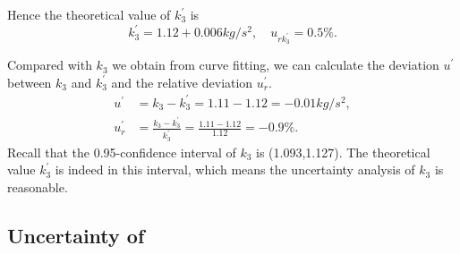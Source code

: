     Hence the theoretical value of $k_3^{'}$ is
    \[
        k_3^{'}=1.12+0.006 kg/s^2,\quad u_{rk_3^{'}}=0.5\%.
    \]
    
    Compared with $k_3$ we obtain from curve fitting, we can calculate the deviation $u^{'}$ between $k_3$ and $k_3^{'}$ and the relative deviation $u_r^{'}$.
    \[ 
    \begin{split}
        u^{'}&=k_3-k_3^{'}=1.11-1.12=-0.01kg/s^2,\\
        u_r^{'}&=\frac{k_3-k_3^{'}}{k_3^{'}}=\frac{1.11-1.12}{1.12}=-0.9\%.
    \end{split}
    \]
    Recall that the 0.95-confidence interval of $k_3$ is (1.093,1.127). The theoretical value $k_3^{'}$ is indeed in this interval, which means the uncertainty analysis of $k_3$ is reasonable.\\
    
\subsection{Uncertainty of}
